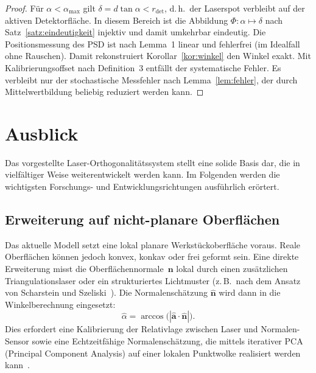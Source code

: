 ﻿\documentclass[a4paper,12pt]{article}
\theoremstyle{definition}
\begin{document}
\begin{proof}
  Für $\alpha < \alpha_{\max}$ gilt $\delta = d\tan\alpha < r_{\mathrm{det}}$,
  d.\,h.\ der Laserspot verbleibt auf der aktiven Detektorfläche.
  In diesem Bereich ist die Abbildung $\Phi: \alpha \mapsto \delta$ nach
  Satz~\ref{satz:eindeutigkeit} injektiv und damit umkehrbar eindeutig.
  Die Positionsmessung des PSD ist nach Lemma~1 linear und fehlerfrei
  (im Idealfall ohne Rauschen).
  Damit rekonstruiert Korollar~\ref{kor:winkel} den Winkel exakt.
  Mit Kalibrierungsoffset nach Definition~3 entfällt der systematische Fehler.
  Es verbleibt nur der stochastische Messfehler nach Lemma~\ref{lem:fehler},
  der durch Mittelwertbildung beliebig reduziert werden kann. \qedhere
\end{proof}

\section{Ausblick}

Das vorgestellte Laser-Orthogonalitätssystem stellt eine solide Basis dar,
die in vielfältiger Weise weiterentwickelt werden kann. Im Folgenden werden
die wichtigsten Forschungs- und Entwicklungsrichtungen ausführlich erörtert.

\subsection{Erweiterung auf nicht-planare Oberflächen}

Das aktuelle Modell setzt eine lokal planare Werkstückoberfläche voraus.
Reale Oberflächen können jedoch konvex, konkav oder frei geformt sein.
Eine direkte Erweiterung misst die Oberflächennormale~$\mathbf{n}$ lokal
durch einen zusätzlichen Triangulationslaser oder ein strukturiertes Lichtmuster
(z.\,B.\ nach dem Ansatz von Scharstein und Szeliski~\cite{scharstein2002taxonomy}).
Die Normalenschätzung $\hat{\mathbf{n}}$ wird dann in die Winkelberechnung
eingesetzt:
\[
  \hat{\alpha} = \arccos\!\bigl(|\hat{\mathbf{a}} \cdot \hat{\mathbf{n}}|\bigr).
\]
Dies erfordert eine Kalibrierung der Relativlage zwischen Laser und
Normalen-Sensor sowie eine Echtzeitfähige Normalenschätzung, die mittels
iterativer PCA (Principal Component Analysis) auf einer lokalen Punktwolke
realisiert werden kann~\cite{rusu2011fast}.
\end{document}
